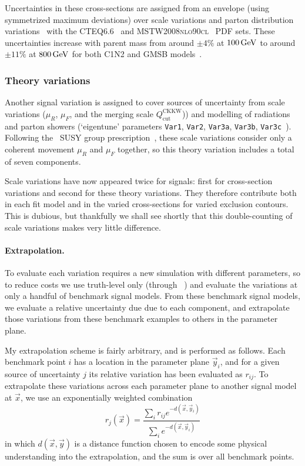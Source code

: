 Uncertainties in these cross-sections are assigned from an envelope
(using symmetrized maximum deviations)
over scale variations and parton distribution variations~\cite{Fuks:2012qx}
with the
\textsc{CTEQ6.6}~\cite{Nadolsky:2008cw} and
\textsc{MSTW2008nlo90cl}~\cite{Martin:2009iq} PDF sets.
These uncertainties increase with parent mass from around
$\pm4\%$ at $100\,\eV[G]$ to around
$\pm11\%$ at $800\,\eV[G]$ for both C1N2 and GMSB models~\cite{
atlas_twiki_xsec_c1n2,
atlas_twiki_xsec_hino
}.

\subsubsection{Theory variations}
\label{sec:2ljets_theory_variations}
Another signal variation is assigned to cover sources of uncertainty from
scale variations ($\mu_R$, $\mu_F$, and the merging scale
$Q_\textrm{cut}^\textrm{CKKW}$)) and modelling of radiations and parton
showers (`eigentune' parameters
\texttt{Var1},
\texttt{Var2},
\texttt{Var3a},
\texttt{Var3b},
\texttt{Var3c}~\cite{ATL-PHYS-PUB-2014-021}).
Following the \atlas\ SUSY group
prescription~\cite{atlas_twiki_susytheoretical},
these scale variations consider only a coherent movement $\mu_R$ and $\mu_F$
together, so this theory variation includes a total of seven components.

Scale variations have now appeared twice for signals:
first for cross-section variations and second for these theory variations.
They therefore contribute both in each fit model and in the varied
cross-sections for varied exclusion contours.
This is dubious, but thankfully we shall see shortly that this double-counting
of scale variations makes very little difference.

\paragraph{Extrapolation.}
To evaluate each variation requires a new simulation with different parameters,
so to reduce costs we use truth-level only
(through \simpleanalysis~\cite{simpleanalysis_cern}) and evaluate the
variations at only a handful of benchmark signal models.
From these benchmark signal models, we evaluate a relative uncertainty due
due to each component, and extrapolate those variations from these benchmark
examples to others in the parameter plane.

My extrapolation scheme is fairly arbitrary, and is performed as follows.
Each benchmark point $i$ has a location in the parameter plane $\vec y_i$, and
for a given source of uncertainty $j$ its relative variation has been evaluated
as $r_{ij}$.
To extrapolate these variations across each parameter plane to another signal
model at $\vec x$, we use an exponentially weighted combination
\begin{equation}
\label{eqn:2ljets_signal_extrap}
r_j(\vec x) = \frac{
\sum_i r_{ij} e^{-d(\vec x, \vec y_i)}
}{
\sum_i e^{-d(\vec x, \vec y_i)}
}
\end{equation}
in which $d(\vec x, \vec y)$ is a distance function chosen to encode some
physical understanding into the extrapolation,
and the sum is over all benchmark points.

